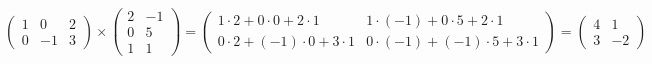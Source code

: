 \begin{example}
    $\begin{pmatrix}
        1 & 0 & 2 \\
        0 & -1 & 3
    \end{pmatrix}
    \times
    \begin{pmatrix}
        2 & -1 \\
        0 & 5 \\
        1 & 1
    \end{pmatrix}
    =
    \begin{pmatrix}
        1 \cdot 2 + 0 \cdot 0 + 2 \cdot 1 & 1 \cdot (-1) + 0 \cdot 5 + 2 \cdot 1 \\
        0 \cdot 2 + (-1) \cdot 0 + 3 \cdot 1 & 0 \cdot (-1) + (-1) \cdot 5 + 3 \cdot 1
    \end{pmatrix}
    =
    \begin{pmatrix}
        4 & 1 \\
        3 & -2
    \end{pmatrix}$
\end{example}
